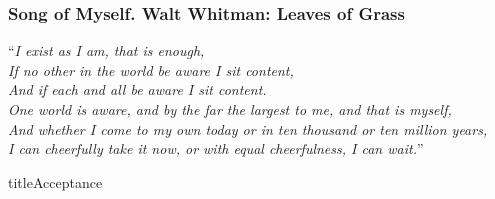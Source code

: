 

\begin{frame}
\frametitle{Song of Myself.  Walt Whitman: Leaves of Grass}
``\textit{I exist as I am, that is enough, \\
If no other in the world be aware I sit content,\\
And if each and all be aware I sit content.\\
One world is aware, and by the far the largest to me, and that is myself,\\
And whether I come to my own today or in ten thousand or ten million years,\\
I can cheerfully take it now, or with equal cheerfulness, I can wait.}''
\end{frame}

title{Acceptance}



